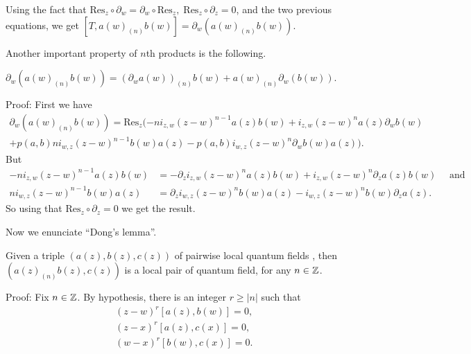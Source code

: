 Using the fact that $\text{Res}_z\circ\partial_w=\partial_w\circ\text{Res}_z, 
\;\text{Res}_z\circ \partial_z =0$, and the two previous equations, we get $[T,a(w)_{(n)}b(w)]=\partial_w(a(w)_{(n)}b(w))$.\par
Another important property of $n$th products is the following.
\begin{dang}
    \begin{lemma}\label{Lemma: d(a(w)nb(w))=da(w)nb(w)+a(w)ndb(w)}
        $\partial_w(a(w)_{(n)}b(w))=(\partial_wa(w))_{(n)}b(w)+a(w)_{(n)}\partial_w(b(w))$.
    \end{lemma}
\end{dang}
Proof: First we have
\begin{equation}
    \begin{split}
        \partial_w(a(w)_{(n)}b(w)) = \text{Res}_z( -ni_{z,w}(z-w)^{n-1}a(z)b(w) +i_{z,w}(z-w)^na(z)\partial_wb(w)\\+p(a,b)ni_{w,z}(z-w)^{n-1}b(w)a(z)-p(a,b)i_{w,z}(z-w)^{n}\partial_wb(w)a(z)).
    \end{split}
\end{equation}
But 
\begin{equation}
\begin{split}
    -ni_{z,w}(z-w)^{n-1}a(z)b(w) &= -\partial_zi_{z,w}(z-w)^na(z)b(w)+i_{z,w}(z-w)^n\partial_za(z)b(w)\quad\text{ and}\\
    ni_{w,z}(z-w)^{n-1}b(w)a(z)&=\partial_zi_{w,z}(z-w)^{n}b(w)a(z)-i_{w,z}(z-w)^{n}b(w)\partial_za(z).
\end{split}
\end{equation}
So using that $\text{Res}_z\circ \partial_z=0$ we get the result.
\par
Now we enunciate ``Dong's lemma''.
\begin{dang}
    \begin{lemma}\label{Lemma: Dong's lemma}\cite{de2006finite}
        Given a triple $(a(z),b(z),c(z))$ of pairwise local quantum fields , then $(a(z)_{(n)}b(z), c(z))$ is a local pair of quantum field, for any $n\in\mathbb{Z}$.
    \end{lemma}
\end{dang}
Proof: Fix $n\in\mathbb{Z}$. By hypothesis, there is an integer $r\geq |n|$ such that
\begin{equation}
   \begin{split}
       &(z-w)^r[a(z),b(w)]=0,\\
        &(z-x)^r[a(z),c(x)]=0,\\
         &(w-x)^r[b(w),c(x)]=0.
   \end{split}
\end{equation}
